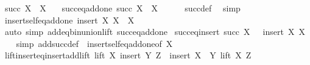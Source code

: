 \begin{isabellebody}
\isamarkupfalse%
\ {\isachardoublequoteopen}succ\ X\ {\isasymequiv}\ X\ {\isacharplus}{\kern0pt}\ {}{\isachardoublequoteclose}\isanewline
\isanewline
{}\isamarkupfalse%
\ succ{\isacharunderscore}{\kern0pt}eq{\isacharunderscore}{\kern0pt}add{\isacharunderscore}{\kern0pt}one{\isacharcolon}{\kern0pt}\ {\isachardoublequoteopen}succ\ X\ {\isacharequal}{\kern0pt}\ X\ {\isacharplus}{\kern0pt}\ {}{\isachardoublequoteclose}\isanewline
%
\isadelimproof
\ \ %
\endisadelimproof
%
\isatagproof
{}\isamarkupfalse%
\ succ{\isacharunderscore}{\kern0pt}def\ \isamarkupfalse%
\ simp%
\endisatagproof
{\isafoldproof}%
%
\isadelimproof
\isanewline
%
\endisadelimproof
\isanewline
{}\isamarkupfalse%
\ insert{\isacharunderscore}{\kern0pt}self{\isacharunderscore}{\kern0pt}eq{\isacharunderscore}{\kern0pt}add{\isacharunderscore}{\kern0pt}one{\isacharcolon}{\kern0pt}\ {\isachardoublequoteopen}insert\ X\ X\ {\isacharequal}{\kern0pt}\ X\ {\isacharplus}{\kern0pt}\ {}{\isachardoublequoteclose}\isanewline
%
\isadelimproof
\ \ %
\endisadelimproof
%
\isatagproof
{}\isamarkupfalse%
\ {\isacharparenleft}{\kern0pt}auto\ simp{\isacharcolon}{\kern0pt}\ add{\isacharunderscore}{\kern0pt}eq{\isacharunderscore}{\kern0pt}bin{\isacharunderscore}{\kern0pt}union{\isacharunderscore}{\kern0pt}lift\ succ{\isacharunderscore}{\kern0pt}eq{\isacharunderscore}{\kern0pt}add{\isacharunderscore}{\kern0pt}one{\isacharparenright}{\kern0pt}%
\endisatagproof
{\isafoldproof}%
%
\isadelimproof
\isanewline
%
\endisadelimproof
\isanewline
{}\isamarkupfalse%
\ succ{\isacharunderscore}{\kern0pt}eq{\isacharunderscore}{\kern0pt}insert{\isacharcolon}{\kern0pt}\ {\isachardoublequoteopen}succ\ X\ \ {\isacharequal}{\kern0pt}\ insert\ X\ X{\isachardoublequoteclose}\isanewline
%
\isadelimproof
\ \ %
\endisadelimproof
%
\isatagproof
{}\isamarkupfalse%
\ {\isacharparenleft}{\kern0pt}simp\ add{\isacharcolon}{\kern0pt}succ{\isacharunderscore}{\kern0pt}def\ \ insert{\isacharunderscore}{\kern0pt}self{\isacharunderscore}{\kern0pt}eq{\isacharunderscore}{\kern0pt}add{\isacharunderscore}{\kern0pt}one{\isacharbrackleft}{\kern0pt}of\ X{\isacharbrackright}{\kern0pt}{\isacharparenright}{\kern0pt}%
\endisatagproof
{\isafoldproof}%
%
\isadelimproof
\isanewline
%
\endisadelimproof
\isanewline
{}\isamarkupfalse%
\ lift{\isacharunderscore}{\kern0pt}insert{\isacharunderscore}{\kern0pt}eq{\isacharunderscore}{\kern0pt}insert{\isacharunderscore}{\kern0pt}add{\isacharunderscore}{\kern0pt}lift{\isacharcolon}{\kern0pt}\ {\isachardoublequoteopen}lift\ X\ {\isacharparenleft}{\kern0pt}insert\ Y\ Z{\isacharparenright}{\kern0pt}\ {\isacharequal}{\kern0pt}\ insert\ {\isacharparenleft}{\kern0pt}X\ {\isacharplus}{\kern0pt}\ Y{\isacharparenright}{\kern0pt}\ {\isacharparenleft}{\kern0pt}lift\ X\ Z{\isacharparenright}{\kern0pt}{\isachardoublequoteclose}\isanewline

\end{isabellebody}
